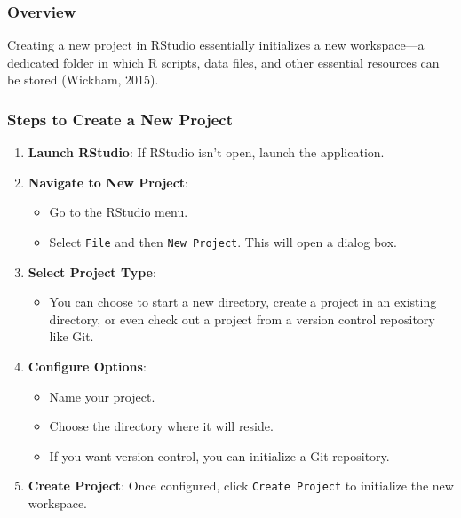 \documentclass[
  b5paper]{book}
\providecommand{\tightlist}{%
  \setlength{\itemsep}{0pt}\setlength{\parskip}{0pt}}
\begin{document}
\hypertarget{overview-8}{%
\subsubsection*{Overview}\label{overview-8}}

Creating a new project in RStudio essentially initializes a new workspace---a dedicated folder in which R scripts, data files, and other essential resources can be stored (Wickham, 2015).

\hypertarget{steps-to-create-a-new-project}{%
\subsubsection*{Steps to Create a New Project}\label{steps-to-create-a-new-project}}

\begin{enumerate}
\def\labelenumi{\arabic{enumi}.}
\item
  \textbf{Launch RStudio}: If RStudio isn't open, launch the application.
\item
  \textbf{Navigate to New Project}:

  \begin{itemize}
  \tightlist
  \item
    Go to the RStudio menu.
  \item
    Select \texttt{File} and then \texttt{New\ Project}. This will open a dialog box.
  \end{itemize}
\item
  \textbf{Select Project Type}:

  \begin{itemize}
  \tightlist
  \item
    You can choose to start a new directory, create a project in an existing directory, or even check out a project from a version control repository like Git.
  \end{itemize}
\item
  \textbf{Configure Options}:

  \begin{itemize}
  \tightlist
  \item
    Name your project.
  \item
    Choose the directory where it will reside.
  \item
    If you want version control, you can initialize a Git repository.
  \end{itemize}
\item
  \textbf{Create Project}: Once configured, click \texttt{Create\ Project} to initialize the new workspace.
\end{enumerate}
\end{document}
